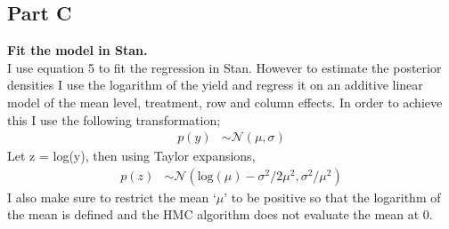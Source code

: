 \documentclass{article}
\begin{document}
\subsection{Part C}
\textbf{Fit the model in Stan.}\\
I use equation 5 to fit the regression in Stan. However to estimate the posterior densities I use the logarithm of the yield and regress it on an additive linear model of the mean level, treatment, row and column effects. In order to achieve this I use the following transformation;
\begin{align*}
p(y) &\sim \mathcal{N}(\mu, \sigma)
\end{align*} 
Let z = log(y), then using Taylor expansions,
\begin{align*}
p(z) &\sim \mathcal{N}(\text{log}(\mu) - \sigma^2/2\mu^2, \sigma^2/\mu^2)
\end{align*} 
I also make sure to restrict the mean `$\mu$' to be positive so that the logarithm of the mean is defined and the HMC algorithm does not evaluate the mean at 0.
\end{document}
